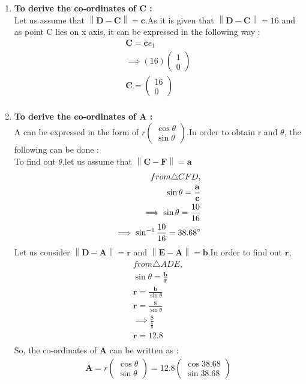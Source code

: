 \documentclass{article}
\providecommand{\norm}[1]{\left\lVert#1\right\rVert}
\newcommand{\myvec}[1]{\ensuremath{\begin{pmatrix}#1\end{pmatrix}}}
\let\vec\mathbf
\begin{document}
\begin{enumerate}
	\item \textbf{To derive the co-ordinates of C :}\\
		Let us assume that $\norm{\vec{D} - \vec{C}} = \vec{c}$.As it is given that $\norm{\vec{D} - \vec{C}} = 16$ and as point C lies on x axis, it can be expressed in the following way : \\
		\begin{align}
			\vec{C} = \vec{c}e_1\\
			\implies (16)\myvec{1\\0}\\
			\vec{C} = \myvec{16\\0}\\
		\end{align}
	\item \textbf{To derive the co-ordinates of A :}\\
		A can be expressed in the form of $r\myvec{\cos{\theta}\\\sin{\theta}}$.In order to obtain r and $\theta$, the following can be done : \\
		To find out $\theta$,let us assume that $\norm{\vec{C} - \vec{F}} = \vec{a}$		
		\begin{align}
			from \triangle{CFD},\\
			\sin{\theta} = \frac{\vec{a}}{\vec{c}}\\
			\implies \sin{\theta} = \frac{10}{16}\\
			\implies \sin^{-1}{\frac{10}{16}} = 38.68\degree\\
		\end{align}
		Let us consider $\norm{\vec{D} - \vec{A}} = \vec{r}$ and $\norm{\vec{E} - \vec{A}} = \vec{b}$.In order to find out $\vec{r}$,
		\begin{align}
			from \triangle{ADE},\\
			\sin{\theta} = \frac{\vec{b}}{\vec{r}}\\
			\vec{r} = \frac{\vec{b}}{\sin{\theta}}\\
			\vec{r} = \frac{8}{\sin{\theta}}\\
			\implies \frac{8}{\frac{5}{8}}\\
			\vec{r} = 12.8\\
		\end{align}
		So, the co-ordinates of $\vec{A}$ can be written as :\\
		\begin{align}
			\vec{A} = r\myvec{\cos{\theta}\\\sin{\theta}} = 12.8\myvec{\cos{38.68}\\\sin{38.68}}\\

\end{align}
\end{enumerate}
\end{document}
